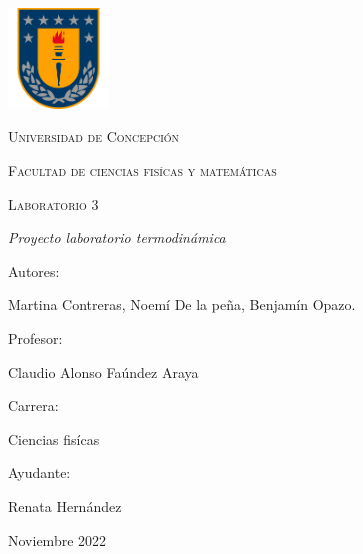 \documentclass[a4paper, 12p]{article}
\begin{document}
\begin{titlepage}
      \begin{center}     
              
            \includegraphics[width=0.2\textwidth]{img/escudo_udec.png}                       %
            
            
            
            \vspace{1cm}
            \textsc{{\LARGE Universidad de Concepción}}
            
            \vspace{1cm}
            {\scshape\Large Facultad de ciencias fisícas y matemáticas \par}
            \vspace{2cm}
            {\scshape\Huge Laboratorio 3 \par}
            \vspace{2cm}
            {\itshape\Large Proyecto laboratorio termodinámica \par}
            \vfill
            {\Large Autores: \par}
            {\Large Martina Contreras, Noemí De la peña, Benjamín Opazo. \par}
            \vfill
            \vfill
            {\Large Profesor: \par}
            {\Large Claudio Alonso Faúndez Araya \par}
            \vfill
            \vfill
            {\Large Carrera: \par}
            {\Large Ciencias fisícas \par}
            \vfill
            \vfill
            {\Large Ayudante: \par}
            {\Large Renata Hernández \par}
            \vfill
            {\Large Noviembre 2022 \par}
      \end{center}
\end{titlepage}            
 

\tableofcontents
\newpage

\end{document}
